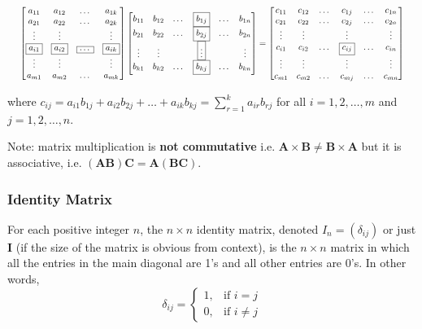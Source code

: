 \documentclass{article}
\theoremstyle{plain}
\theoremstyle{definition}
\theoremstyle{remark}
\begin{document}
\[
\scalebox{0.76}{$
\begin{bmatrix}
a_{11} & a_{12} & \dots & a_{1k} \\
a_{21} & a_{22} & \dots & a_{2k} \\
\vdots & \vdots & & \vdots \\
\fbox{$a_{i1}$} & \fbox{$a_{i2}$} & \fbox{$\dots$} & \fbox{$a_{ik}$} \\
\vdots & \vdots & & \vdots \\
a_{m1} & a_{m2} & \dots & a_{mk}
\end{bmatrix}
\begin{bmatrix}
b_{11} & b_{12} & \dots & \fbox{$b_{1j}$} & \dots & b_{1n} \\
b_{21} & b_{22} & \dots & \fbox{$b_{2j}$} & \dots & b_{2n} \\
\vdots & \vdots & & \fbox{$\vdots$} & & \vdots \\
b_{k1} & b_{k2} & \dots & \fbox{$b_{kj}$} & \dots & b_{kn}
\end{bmatrix}
=
\begin{bmatrix}
c_{11} & c_{12} & \dots & c_{1j} & \dots & c_{1n} \\
c_{21} & c_{22} & \dots & c_{2j} & \dots & c_{2n} \\
\vdots & \vdots & & \vdots & & \vdots \\
c_{i1} & c_{i2} & \dots & \fbox{$c_{ij}$} & \dots & c_{in} \\
\vdots & \vdots & & \vdots & & \vdots \\
c_{m1} & c_{m2} & \dots & c_{mj} & \dots & c_{mn}
\end{bmatrix}
$}
\]
 
where $c_{ij} = a_{i1}b_{1j} + a_{i2}b_{2j} + \dots + a_{ik}b_{kj} = \sum_{r=1}^{k} a_{ir}b_{rj}$ for all $i = 1,2,\dots,m$ and $j = 1,2,\dots,n$.
 
Note: matrix multiplication is \textbf{not commutative} i.e. $\mathbf{A} \times \mathbf{B} \neq \mathbf{B} \times \mathbf{A}$ but it is associative, i.e. $(\mathbf{AB})\mathbf{C} = \mathbf{A}(\mathbf{BC})$.
 
\subsubsection*{Identity Matrix}
For each positive integer $n$, the $n \times n$ identity matrix, denoted $I_n = (\delta_{ij})$ or just $\mathbf{I}$ (if the size of the matrix is obvious from context), is the $n \times n$ matrix in which all the entries in the main diagonal are 1's and all other entries are 0's. In other words,
\[
\delta_{ij} =
\begin{cases}
1, & \text{if } i = j \\
0, & \text{if } i \neq j
\end{cases}
\]
 
\end{document}
